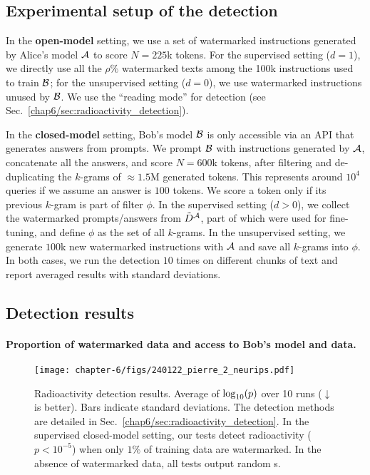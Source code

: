 \subsection{Experimental setup of the detection}\label{chap6/sec:detection-setup}

In the \textbf{open-model} setting, we use a set of watermarked instructions generated by Alice's model $\mathcal A$ to score $N=225$k tokens.
For the supervised setting ($d=1$), we directly use all the $\rho\%$ watermarked texts among the 100k instructions used to train $\mathcal B$; for the unsupervised setting ($d=0$), we use watermarked instructions unused by $\mathcal B$.
We use the ``reading mode'' for detection (see Sec.~\ref{chap6/sec:radioactivity_detection}).

In the \textbf{closed-model} setting, Bob's model $\mathcal B$ is only accessible via an API that generates answers from prompts.
We prompt $\mathcal B$ with instructions generated by $\mathcal A$, concatenate all the answers, and score $N=600$k tokens, after filtering and de-duplicating the $k$-grams of $\approx1.5$M generated tokens.
This represents around $10^4$ queries if we assume an answer is $100$ tokens.
We score a token only if its previous $k$-gram is part of filter $\phi$. 
In the supervised setting ($d>0$), we collect the watermarked prompts/answers from $\Tilde{D}^\mathcal A$, part of which were used for fine-tuning, and define $\phi$ as the set of all $k$-grams.
In the unsupervised setting, we generate $100$k new watermarked instructions with $\mathcal A$ and save all $k$-grams into $\phi$.
In both cases, we run the detection $10$ times on different chunks of text and report averaged results with standard deviations.



\subsection{Detection results}

\paragraph{Proportion of watermarked data and access to Bob's model and data.}


\begin{figure}[b!]
    \centering
    \hspace{-0.5cm}
    \texttt{[image: chapter-6/figs/240122\_pierre\_2\_neurips.pdf]}
    \caption{
        Radioactivity detection results.
        Average of $\log_{10}(p)$ over 10 runs ($\downarrow$ is better). Bars indicate standard deviations.
        The detection methods are detailed in Sec.~\ref{chap6/sec:radioactivity_detection}.
        In the supervised closed-model setting, our tests detect radioactivity ($p<10^{-5}$) when only $1\%$ of training data are watermarked.
        In the absence of watermarked data, all tests output random \pval s.
    }
    \label{chap6/fig:wm-proportion}
\end{figure}


